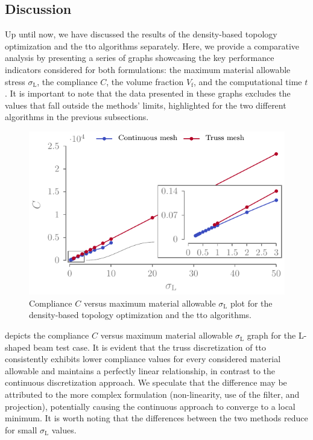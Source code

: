 \subsection{Discussion}
Up until now, we have discussed the results of the density-based topology optimization and the \gls{tto} algorithms separately. Here, we provide a comparative analysis by presenting a series of graphs showcasing the key performance indicators considered for both formulations: the maximum material allowable stress $\sigma_\text{L}$, the compliance $C$, the volume fraction $V_\text{f}$, and the computational time $t$. It is important to note that the data presented in these graphs excludes the values that fall outside the methods' limits, highlighted for the two different algorithms in the previous subsections.
\begin{figure}
    \centering
    \includegraphics{figures/03_comparison_TO_TTO/14_stress_comp/stress_comp.pdf}
    \caption{Compliance $C$ versus maximum material allowable $\sigma_\text{L}$ plot for the density-based topology optimization and the \gls{tto} algorithms.}
    \label{fig:03_stress_comp}
\end{figure}

 depicts the compliance $C$ versus maximum material allowable $\sigma_\text{L}$ graph for the L-shaped beam test case. It is evident that the truss discretization of \gls{tto} consistently exhibits lower compliance values for every considered material allowable and maintains a perfectly linear relationship, in contrast to the continuous discretization approach. We speculate that the difference may be attributed to the more complex formulation (non-linearity, use of the filter, and projection), potentially causing the continuous approach to converge to a local minimum. It is worth noting that the differences between the two methods reduce for small $\sigma_\text{L}$ values.

